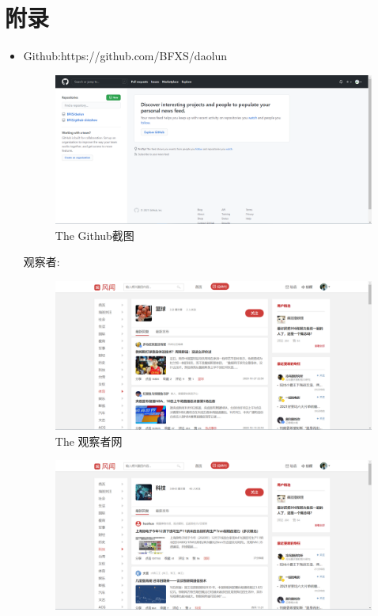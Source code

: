 \documentclass{article}
\begin{document}
\section{附录}
\begin{itemize}
    \item  Github:https://github.com/BFXS/daolun
    		 \begin{figure}[h!]
    		\centering
    		\includegraphics[scale=0.5]{github}
    		\caption{The Github截图}
    		\label{fig:github}
    		\end{figure}
    		观察者:
    		\begin{figure}[h!]
    			\centering
    			\includegraphics[scale=0.5]{guan1}
    			\caption{The 观察者网}
    			\label{fig:guan1}
    		\end{figure}
    	\begin{figure}[h!]
    		\centering
    		\includegraphics[scale=0.5]{guan2}

\end{figure}
\end{itemize}
\end{document}
